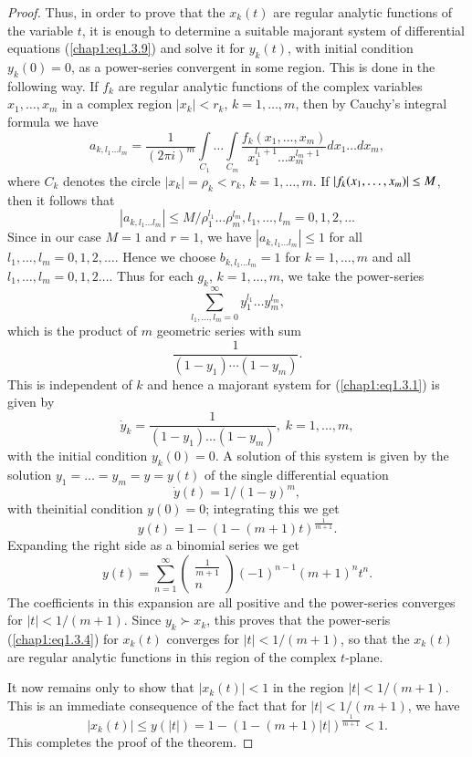 \begin{proof}
Thus, in order to prove that the $x_k(t)$ are regular analytic functions of the variable $t$, it is enough to determine a suitable majorant system of differential equations (\ref{chap1:eq1.3.9}) and solve it for $y_k(t)$, with initial condition $y_k(0) = 0$, as a power-series convergent in some region. This is done in the following way. If $f_k$ are regular analytic functions of the complex variables $x_1, \ldots, x_m$ in a complex region $|x_k| < r_k$, $k=1, \ldots, m$, then by  Cauchy's integral formula we have
$$
a_{k, l_1 \ldots  l_m} = \frac{1}{(2\pi i)^m} \int\limits_{C_1} \ldots \int\limits_{C_m} \frac{f_k (x_1, \ldots , x_m)}{x^{l_1 + 1}_1 \ldots x^{l_m+1}_m} dx_1 \ldots dx_m,
$$\pageoriginale
where $C_k$ denotes the circle $|x_k| = \rho_k < r_k$, $k = 1, \ldots,
m$. If $|f_k (x_1, \ldots,\break x_m)| \leq M$, then it follows that 
$$
|a_{k,l_1 \ldots l_m}| \leq M/ \rho^{l_1}_1 \ldots \rho^{l_m}_m, l_1, \ldots , l_m = 0, 1,2, \ldots 
$$ 
Since in our case $M=1$ and $r=1$, we have $|a_{k,l_1 \ldots l_m}| \leq 1$ for all $l_1, \ldots, l_m = 0,1,2, \ldots$. Hence we choose $b_{k,l_1 \ldots l_m} =1$ for $k=1, \ldots,m$ and all $l_1, \ldots, l_m = 0,1,2 \ldots$. Thus for each $g_k$, $k =1,\ldots, m$, we take the power-series 
$$
\sum\limits^\infty_{l_1, \ldots, l_m = 0} y^{l_1}_1 \ldots y^{l_m}_m,
$$
which is the product of $m$ geometric series with sum 
$$\dfrac{1}{(1-y_1) \cdots (1-y_m)}.$$ 
This is independent of $k$ and hence a majorant system for (\ref{chap1:eq1.3.1}) is given by 
$$
\dot{y}_k = \frac{1}{(1-y_1) \ldots (1-y_m)}, \; k = 1, \ldots , m,
$$
with the initial condition $y_k (0) = 0$. A solution of this system is given by the solution $y_1 = \ldots = y_m = y = y(t)$ of the single differential equation
$$
\dot{y} (t) = 1/ (1-y)^m, 
$$
with the\pageoriginale initial condition $y(0) = 0$; integrating this we get 
$$
y(t) = 1 - (1-(m+1) t)^{\frac{1}{m+1}}.
$$
Expanding the right side as a binomial series we get
$$
y(t) = \sum\limits^\infty_{n=1} \begin{pmatrix}
\frac{1}{m+1} \\
n
\end{pmatrix} (-1)^{n-1} (m+1)^n t^n.
$$
The coefficients in this expansion are all positive and the power-series converges for $|t| < 1 / (m+1)$. Since $y_k \succ x_k$, this proves that the power-seris (\ref{chap1:eq1.3.4}) for $x_k(t)$ converges for $|t| < 1/(m+1)$, so that the $x_k(t)$ are regular analytic functions in this region of the complex $t$-plane.

It now remains only to show that $|x_k(t)| <1$ in the region $|t| < 1/(m+1)$. This is an immediate consequence of the fact that for $|t|<1 /(m+1)$, we have
$$
|x_k(t)| \leq y(|t|) = 1 - (1-(m+1)|t|)^{\frac{1}{m+1}} < 1. 
$$
This completes the proof of the theorem.


\end{proof}
